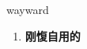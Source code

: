 
\begin{frame}
{\huge wayward}
\begin{center}
\begin{enumerate}\Large
  \item \textbf{刚愎自用的}
\end{enumerate}
\end{center}
\end{frame}
